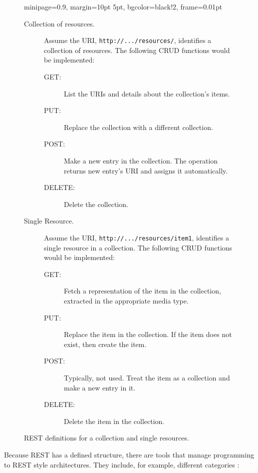 \begin{figure}[htb] 

\begin{adjustbox}{minipage=0.9\columnwidth,
                  margin=10pt 5pt,%
                  bgcolor={black!2},%
                  frame=0.01pt}%
{\footnotesize
\begin{description}
\item[Collection of resources.] Assume the URI,  \verb|http://.../resources/|, identifies a
  collection of resources. The following CRUD functions would be
  implemented:

  \begin{description}
  \item
    [GET:] List the URIs and details about the collection's
    items.
  \item[PUT:] Replace the collection with a different collection.
  \item[POST:] Make a new entry in the collection. The operation
    returns new entry's URI and assigns it automatically.
  \item
    [DELETE:] Delete the collection.
  \end{description}
  \bigskip

\item[Single Resource.] Assume the URI, \verb|http://.../resources/item1|, identifies a
  single resource in a collection. The following CRUD functions would be
  implemented:

  \begin{description}
  \item
    [GET:] Fetch a representation of the item in the collection,
    extracted in the appropriate media type.
  \item
    [PUT:] Replace the item in the collection. If the item does
    not exist, then create the item.
  \item
    [POST:] Typically, not used. Treat the item as a collection
    and make a new entry in it.
  \item
    [DELETE:] Delete the item in the collection.
  \end{description}
\end{description}
}
\end{adjustbox}
\caption{REST definitions for a collection and single resources.}
\label{fig:rest}
\end{figure}

Because REST has a defined structure, there are tools that manage
programming to REST style architectures. They include, for example, different categories
\cite{las-book-cloud}:


